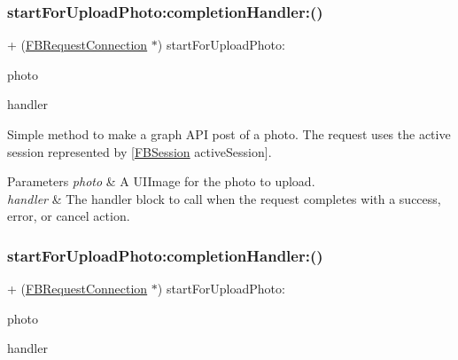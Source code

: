 \subsubsection{\texorpdfstring{start\+For\+Upload\+Photo\+:completion\+Handler\+:()}{startForUploadPhoto:completionHandler:()}\hspace{0.1cm}{\footnotesize\ttfamily [4/5]}}
{\footnotesize\ttfamily + (\hyperlink{interfaceFBRequestConnection}{F\+B\+Request\+Connection} $\ast$) start\+For\+Upload\+Photo\+: \begin{DoxyParamCaption}\item[{(U\+I\+Image $\ast$)}]{photo }\item[{completionHandler:(F\+B\+Request\+Handler)}]{handler }\end{DoxyParamCaption}}

Simple method to make a graph A\+PI post of a photo. The request uses the active session represented by {\ttfamily \mbox{[}\hyperlink{interfaceFBSession}{F\+B\+Session} active\+Session\mbox{]}}.


\begin{DoxyParams}{Parameters}
{\em photo} & A {\ttfamily U\+I\+Image} for the photo to upload. \\
\hline
{\em handler} & The handler block to call when the request completes with a success, error, or cancel action. \\
\hline
\end{DoxyParams}
\mbox{\label{interfaceFBRequestConnection_a824e16e083537312be6d59c8bece3f0e}} 
\subsubsection{\texorpdfstring{start\+For\+Upload\+Photo\+:completion\+Handler\+:()}{startForUploadPhoto:completionHandler:()}\hspace{0.1cm}{\footnotesize\ttfamily [5/5]}}
{\footnotesize\ttfamily + (\hyperlink{interfaceFBRequestConnection}{F\+B\+Request\+Connection} $\ast$) start\+For\+Upload\+Photo\+: \begin{DoxyParamCaption}\item[{(U\+I\+Image $\ast$)}]{photo }\item[{completionHandler:(F\+B\+Request\+Handler)}]{handler }\end{DoxyParamCaption}}

